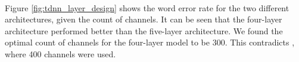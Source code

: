 \\
Figure \ref{fig:tdnn_layer_design} shows the word error rate for the two different architectures, given the count of channels. It can be seen that the four-layer architecture performed better than the five-layer architecture. We found the optimal count of channels  for the four-layer model to be 300. This contradicts \cite{peddinti2015reverberation}, where 400 channels were used. \\ \\
\begin{minipage}{\linewidth}
	\label{fig:tdnn_layer_design}
\end{minipage} 
